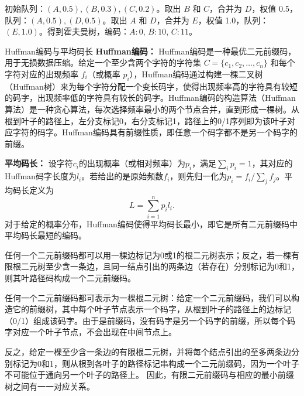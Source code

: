 \documentclass[lang=cn,11pt]{elegantbook}
\begin{document}
初始队列：$(A,0.5), (B,0.3), (C,0.2)$。取出 $B$ 和 $C$，合并为 $D$，权值 0.5，队列：$(A,0.5), (D,0.5)$。取出 $A$ 和 $D$，合并为 $E$，权值 1.0，队列：$(E,1.0)$。得到霍夫曼树，编码：$A:0$, $B:10$, $C:11$。
\begin{definition}{Huffman编码与平均码长}
\textbf{Huffman编码：} Huffman编码是一种最优二元前缀码，用于无损数据压缩。给定一个至少含两个字符的字符集 $C = \{c_1, c_2, \dots, c_n\}$ 和每个字符对应的出现频率 $f_i$（或概率 $p_i$），Huffman编码通过构建一棵二叉树（Huffman树）来为每个字符分配一个变长码字，使得出现频率高的字符具有较短的码字，出现频率低的字符具有较长的码字。Huffman编码的构造算法（Huffman算法）是一种贪心算法，每次选择频率最小的两个节点合并，直到形成一棵树。从根到叶子的路径上，左分支标记0，右分支标记1，路径上的0/1序列即为该叶子对应字符的码字。Huffman编码具有前缀性质，即任意一个码字都不是另一个码字的前缀。

\textbf{平均码长：} 设字符$c_i$的出现概率（或相对频率）为$p_i$，满足$\sum_i p_i=1$，其对应的Huffman码字长度为$l_i$。若给出的是原始频数$f_i$，则先归一化为$p_i=f_i/\sum_j f_j$。平均码长定义为
\[
L = \sum_{i=1}^n p_i l_i.
\]
对于给定的概率分布，Huffman编码使得平均码长最小，即它是所有二元前缀码中平均码长最短的编码。
\end{definition}
\begin{theorem}
任何一个二元前缀码都可以用一棵边标记为0或1的根二元树表示；反之，若一棵有限根二元树至少含一条边，且同一结点引出的两条边（若存在）分别标记为0和1，则其叶路径码构成一个二元前缀码。
\end{theorem}
任何一个二元前缀码都可表示为一棵根二元树：给定一个二元前缀码，我们可以构造它的前缀树，其中每个叶子节点表示一个码字，从根到叶子的路径上的边标记（0/1）组成该码字。由于是前缀码，没有码字是另一个码字的前缀，所以每个码字对应一个叶子节点，不会出现在中间节点上。

反之，给定一棵至少含一条边的有限根二元树，并将每个结点引出的至多两条边分别标记为0和1，则从根到各叶子的路径标记串构成一个二元前缀码，因为一个叶子不可能位于通向另一个叶子的路径上。
因此，有限二元前缀码与相应的最小前缀树之间有一一对应关系。
\end{document}
